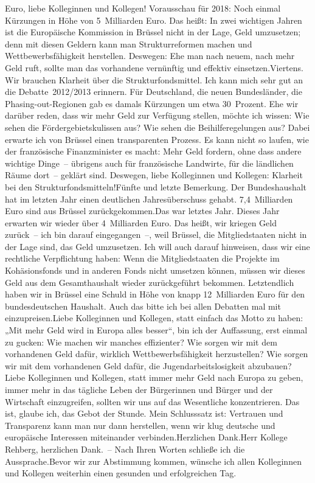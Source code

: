 \documentclass{article}
\begin{document}
Euro, liebe Kolleginnen und Kollegen! Vorausschau für 2018: Noch einmal Kürzungen in Höhe von 5 Milliarden Euro. Das heißt: In zwei wichtigen Jahren ist die Europäische Kommission in Brüssel nicht in der Lage, Geld umzusetzen; denn mit diesen Geldern kann man Strukturreformen machen und Wettbewerbsfähigkeit herstellen. Deswegen: Ehe man nach neuem, nach mehr Geld ruft, sollte man das vorhandene vernünftig und effektiv einsetzen.Viertens. Wir brauchen Klarheit über die Strukturfondsmittel. Ich kann mich sehr gut an die Debatte 2012/2013 erinnern. Für Deutschland, die neuen Bundesländer, die Phasing-out-Regionen gab es damals Kürzungen um etwa 30 Prozent. Ehe wir darüber reden, dass wir mehr Geld zur Verfügung stellen, möchte ich wissen: Wie sehen die Fördergebietskulissen aus? Wie sehen die Beihilferegelungen aus? Dabei erwarte ich von Brüssel einen transparenten Prozess. Es kann nicht so laufen, wie der französische Finanzminister es macht: Mehr Geld fordern, ohne dass andere wichtige Dinge – übrigens auch für französische Landwirte, für die ländlichen Räume dort – geklärt sind. Deswegen, liebe Kolleginnen und Kollegen: Klarheit bei den Strukturfondsmitteln!Fünfte und letzte Bemerkung. Der Bundeshaushalt hat im letzten Jahr einen deutlichen Jahresüberschuss gehabt. 7,4 Milliarden Euro sind aus Brüssel zurückgekommen.Das war letztes Jahr. Dieses Jahr erwarten wir wieder über 4 Milliarden Euro. Das heißt, wir kriegen Geld zurück – ich bin darauf eingegangen –, weil Brüssel, die Mitgliedstaaten nicht in der Lage sind, das Geld umzusetzen. Ich will auch darauf hinweisen, dass wir eine rechtliche Verpflichtung haben: Wenn die Mitgliedstaaten die Projekte im Kohäsionsfonds und in anderen Fonds nicht umsetzen können, müssen wir dieses Geld aus dem Gesamthaushalt wieder zurückgeführt bekommen. Letztendlich haben wir in Brüssel eine Schuld in Höhe von knapp 12 Milliarden Euro für den bundesdeutschen Haushalt. Auch das bitte ich bei allen Debatten mal mit einzupreisen.Liebe Kolleginnen und Kollegen, statt einfach das Motto zu haben: „Mit mehr Geld wird in Europa alles besser“, bin ich der Auffassung, erst einmal zu gucken: Wie machen wir manches effizienter? Wie sorgen wir mit dem vorhandenen Geld dafür, wirklich Wettbewerbsfähigkeit herzustellen? Wie sorgen wir mit dem vorhandenen Geld dafür, die Jugendarbeitslosigkeit abzubauen? Liebe Kolleginnen und Kollegen, statt immer mehr Geld nach Europa zu geben, immer mehr in das tägliche Leben der Bürgerinnen und Bürger und der Wirtschaft einzugreifen, sollten wir uns auf das Wesentliche konzentrieren. Das ist, glaube ich, das Gebot der Stunde. Mein Schlusssatz ist: Vertrauen und Transparenz kann man nur dann herstellen, wenn wir klug deutsche und europäische Interessen miteinander verbinden.Herzlichen Dank.Herr Kollege Rehberg, herzlichen Dank. – Nach Ihren Worten schließe ich die Aussprache.Bevor wir zur Abstimmung kommen, wünsche ich allen Kolleginnen und Kollegen weiterhin einen gesunden und erfolgreichen Tag.
\end{document}
